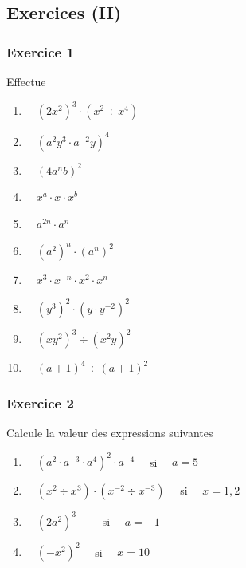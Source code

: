 \documentclass[
  12pt,
]{book}
\providecommand{\tightlist}{%
  \setlength{\itemsep}{0pt}\setlength{\parskip}{0pt}}
\begin{document}
\hypertarget{exercices-ii}{%
\subsection{Exercices (II)}\label{exercices-ii}}

\hypertarget{exercice-1-1}{%
\subsubsection*{Exercice 1}\label{exercice-1-1}}

Effectue

\begin{enumerate}
\def\labelenumi{\arabic{enumi}.}
\tightlist
\item
  \(\quad (2x^2)^3\cdot (x^2\div x^4)\)
\item
  \(\quad (a^2y^3\cdot a^{-2}y)^4\)
\item
  \(\quad (4a^nb)^2\)
\item
  \(\quad x^a\cdot x\cdot x^b\)
\item
  \(\quad a^{2n}\cdot a^n\)
\item
  \(\quad (a^2)^n\cdot (a^n)^2\)
\item
  \(\quad x^3\cdot x^{-n}\cdot x^2\cdot x^n\)
\item
  \(\quad (y^3)^2\cdot(y\cdot y^{-2})^2\)
\item
  \(\quad (xy^2)^3\div(x^2y)^2\)
\item
  \(\quad (a+1)^4\div (a+1)^2\)
\end{enumerate}

\hypertarget{exercice-2}{%
\subsubsection*{Exercice 2}\label{exercice-2}}

Calcule la valeur des expressions suivantes

\begin{enumerate}
\def\labelenumi{\arabic{enumi}.}
\tightlist
\item
  \(\quad (a^2\cdot a^{-3}\cdot a^4)^2\cdot a^{-4}\quad\) si \(\quad a=5\)
\item
  \(\quad (x^2\div x^3)\cdot(x^{-2}\div x^{-3})\quad\) si \(\quad x=1{,}2\)
\item
  \(\quad (2a^2)^3\qquad\) si \(\quad a=-1\)
\item
  \(\quad (-x^2)^2\quad\) si \(\quad x=10\)
\end{enumerate}
\end{document}
